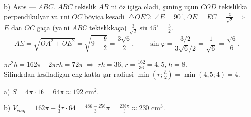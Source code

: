 b) Asos — $ABC$. $ABC$ tekislik $AB$ ni öz içiga oladi, şuning uçun $COD$ tekislikka perpendikulyar va uni $OC$ böyiça kesadi. $\triangle OEC$: $\angle E=90^\circ$, $OE=EC=\frac3{\sqrt2}$ $\Rightarrow$ $E$ dan $OC$ gaça (ya'ni $ABC$ tekislikkaça) $\frac3{\sqrt2}\sin45^\circ=\frac32$.
\[AE=\sqrt{OA^2+OE^2}=\sqrt{9+\frac92}=\frac{3\sqrt6}2,\qquad\sin\varphi=\frac{3/2}{3\sqrt6/2}=\frac1{\sqrt6}=\frac{\sqrt6}6.\]

\newpage
{}
$\pi r^2h=162\pi$, \ $2\pi rh=72\pi$ $\Rightarrow$ $rh=36$, $r=\frac{162}{36}=4{,}5$, $h=8$.\\
Silindrdan kesiladigan eng katta şar radiusi $\min\left(r;\frac h2\right)=\min(4{,}5;4)=4$.

a) $S=4\pi\cdot16=64\pi\approx192$ cm$^2$.

b) $V_{chiq}=162\pi-\frac43\pi\cdot64=\frac{486-256}3\pi=\frac{230\pi}3\approx230$ cm$^3$.

\ShowJavoblar

